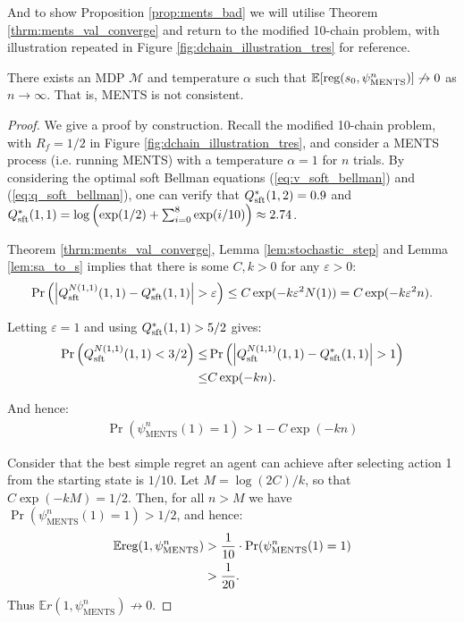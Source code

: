 \documentclass{article}
\newcommand{\bb}[1]{\mathbb{#1}}
\newcommand{\cl}[1]{\mathcal{#1}}
\newcommand{\Qsp}[3]{Q^{#3}_{\textnormal{sft}}(#1,#2)}
\newcommand{\Qss}[2]{Q^*_{\textnormal{sft}}(#1,#2)}
\newcommand{\reg}{\textnormal{reg}}
\theoremstyle{plain}
\begin{document}
\begin{appendices}
    
        And to show Proposition \ref{prop:ments_bad} we will utilise Theorem \ref{thrm:ments_val_converge} and return to the modified 10-chain problem, with illustration repeated in Figure \ref{fig:dchain_illustration_tres} for reference.
        
        \begin{customprop}{3.1}
            There exists an MDP $\cl{M}$ and temperature $\alpha$ such that $\bb{E}[\reg(s_0,\psi^n_{\textnormal{MENTS}})] \not\to 0$ as $n\to\infty$. That is, MENTS is not consistent.
        \end{customprop}
        
        \begin{proof}
            We give a proof by construction. Recall the modified 10-chain problem, with $R_f=1/2$ in Figure \ref{fig:dchain_illustration_tres}, and consider a MENTS process (i.e. running MENTS) with a temperature $\alpha=1$ for $n$ trials. By considering the optimal soft Bellman equations (\ref{eq:v_soft_bellman}) and (\ref{eq:q_soft_bellman}), one can verify that $\Qss{1}{2}=0.9$ and $\Qss{1}{1}=\log\left(\exp(1/2)+\sum_{i=0}^8\exp(i/10)\right)\approx 2.74$. 
            
            Theorem \ref{thrm:ments_val_converge}, Lemma \ref{lem:stochastic_step} and Lemma \ref{lem:sa_to_s} implies that there is some $C,k>0$ for any $\varepsilon > 0$:
            \begin{align}
                \Pr\left(\left| \Qsp{1}{1}{N(1,1)} - \Qss{1}{1}\right| > \varepsilon \right) \leq C\exp(-k\varepsilon^2 N(1)) = C\exp(-k\varepsilon^2 n).
            \end{align}
            
            Letting $\varepsilon=1$ and using $\Qss{1}{1}>5/2$ gives:
            \begin{align}
                \Pr\left(\Qsp{1}{1}{N(1,1)} < 3/2 \right) 
                    \leq& \Pr\left(\left| \Qsp{1}{1}{N(1,1)} - \Qss{1}{1}\right| > 1 \right) \\
                    \leq& C\exp(-kn).
            \end{align}
            
            And hence:
            \begin{align}
                \Pr(\psi^n_{\text{MENTS}}(1)=1) > 1 - C\exp(-kn)
            \end{align}
            
            Consider that the best simple regret an agent can achieve after selecting action 1 from the starting state is $1/10$. Let $M=\log(2C)/k$, so that $C\exp(-kM)=1/2$. Then, for all $n>M$ we have $\Pr(\psi^n_{\text{MENTS}}(1)=1)> 1/2$, and hence:
            \begin{align}
                \bb{E}\reg(1,\psi^n_{\text{MENTS}}) &> \frac{1}{10} \cdot \Pr(\psi^n_{\text{MENTS}}(1)=1) \\
                    &> \frac{1}{20}.
            \end{align}
            Thus $\bb{E}r(1,\psi^n_{\text{MENTS}})\not\rightarrow 0$.
        \end{proof}
        

\end{appendices}
\end{document}
